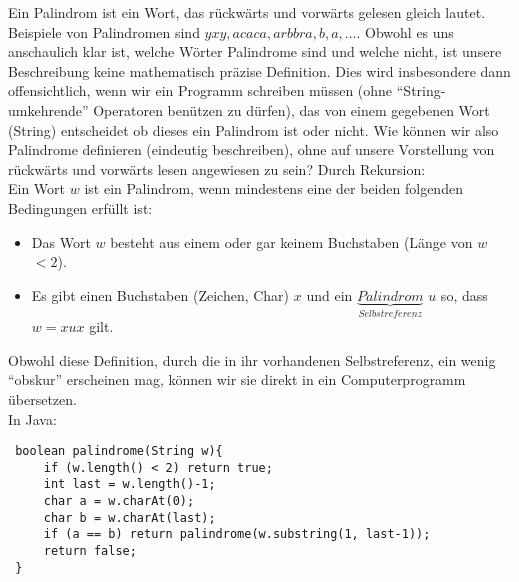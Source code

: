 \begin{example}
Ein Palindrom ist ein Wort, das rückwärts und vorwärts gelesen gleich lautet. Beispiele von Palindromen sind $yxy,acaca,arbbra,b,a,\dots$. Obwohl es uns anschaulich klar ist, welche Wörter Palindrome sind und welche nicht, ist unsere Beschreibung keine mathematisch präzise Definition. Dies wird insbesondere dann offensichtlich, wenn wir ein Programm schreiben müssen (ohne ``String-umkehrende'' Operatoren benützen zu dürfen), das von einem gegebenen Wort (String) entscheidet ob dieses ein Palindrom ist oder nicht. Wie können wir also Palindrome definieren (eindeutig beschreiben), ohne auf unsere Vorstellung von rückwärts und vorwärts lesen angewiesen zu sein? Durch Rekursion:\\
Ein Wort $w$ ist ein Palindrom, wenn mindestens eine der beiden folgenden Bedingungen erfüllt ist:
\begin{itemize}
\item Das Wort $w$ besteht aus einem oder gar keinem Buchstaben (Länge von $w$ $<2$).
\item Es gibt einen Buchstaben (Zeichen, Char) $x$ und ein $\underbrace{Palindrom}_{Selbstreferenz}$ $u$ so, dass $w=xux$ gilt.
\end{itemize}
Obwohl diese Definition, durch die in ihr vorhandenen Selbstreferenz, ein wenig ``obskur'' erscheinen mag, können wir sie direkt in ein Computerprogramm übersetzen.\\
In Java:

\lstset{language=Java}
\begin{framed}
\begin{lstlisting}
 boolean palindrome(String w){
     if (w.length() < 2) return true;
     int last = w.length()-1;
     char a = w.charAt(0);
     char b = w.charAt(last);
     if (a == b) return palindrome(w.substring(1, last-1));
     return false;
 }
\end{lstlisting}
\end{framed}
\end{example}


